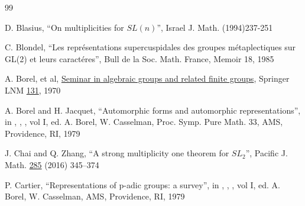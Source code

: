 \documentclass[12pt,letterpaper]{book}
\theoremstyle{plain}
\theoremstyle{definition}
\theoremstyle{remark}
\theoremstyle{remark}
\begin{document}
\begin{thebibliography}{99}

 D. Blasius, ``On multiplicities for $SL(n)$'',
Israel J. Math. (1994)237-251

 C. Blondel, ``Les repr\'esentations supercuspidales
des groupes
m\'etaplectiques sur GL(2) et leurs caract\'eres'',
Bull de la Soc. Math. France, Memoir 18, 1985


 A. Borel, et al, \underline{Seminar in algebraic groups and
related finite groups}, Springer LNM \underline{131}, 1970

 A. Borel and H. Jacquet, ``Automorphic forms and automorphic
representations'', in  ,
,  ,
vol I, ed. A. Borel, W. Casselman, Proc. Symp. Pure Math. 33, AMS,
Providence, RI, 1979

 J. Chai and Q. Zhang, ``A strong multiplicity one theorem
for $SL_2$'', Pacific J. Math. \underline{285} (2016) 345--374


 P. Cartier, ``Representations of p-adic groups: a survey'',
in  ,
,  ,
vol I, ed. A. Borel, W. Casselman, AMS, Providence, RI, 1979







\end{thebibliography}
\end{document}

